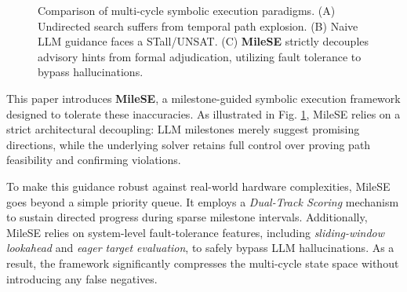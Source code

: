 \documentclass[conference]{IEEEtran}
\begin{document}
\begin{figure}[t]
{%
    }
    \caption{Comparison of multi-cycle symbolic execution paradigms. (A) Undirected search suffers from temporal path explosion. (B) Naive LLM guidance faces a STall/UNSAT. (C) \textbf{MileSE} strictly decouples advisory hints from formal adjudication, utilizing fault tolerance to bypass hallucinations.}
    \label{fig:teaser}
\end{figure}

This paper introduces \textbf{MileSE}, a milestone-guided symbolic execution framework designed to tolerate these inaccuracies. As illustrated in Fig. \ref{fig:teaser}, MileSE relies on a strict architectural decoupling: LLM milestones merely suggest promising directions, while the underlying solver retains full control over proving path feasibility and confirming violations.

To make this guidance robust against real-world hardware complexities, MileSE goes beyond a simple priority queue. It employs a \textit{Dual-Track Scoring} mechanism to sustain directed progress during sparse milestone intervals. Additionally, MileSE relies on system-level fault-tolerance features, including \textit{sliding-window lookahead} and \textit{eager target evaluation}, to safely bypass LLM hallucinations. As a result, the framework significantly compresses the multi-cycle state space without introducing any false negatives.
\end{document}
